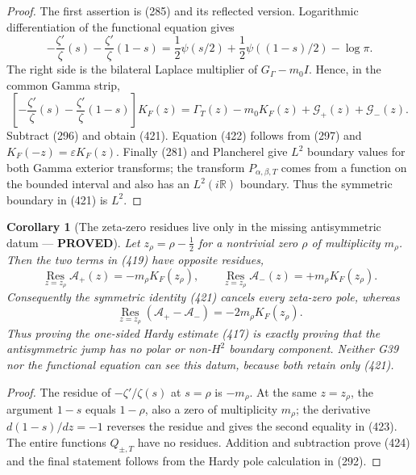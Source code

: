 \documentclass[11pt]{article}
\newtheorem{corollary}[theorem]{Corollary}
\newcommand{\PROVED}{\textcolor{green!45!black}{\textbf{PROVED}}}
\begin{document}
\begin{proof}
The first assertion is (285) and its reflected version.  Logarithmic
differentiation of the functional equation gives
\[
 -\frac{\zeta'}{\zeta}(s)
 -\frac{\zeta'}{\zeta}(1-s)
 =\frac12\psi(s/2)+\frac12\psi((1-s)/2)-\log\pi.
\]
The right side is the bilateral Laplace multiplier of
$G_\Gamma-m_0I$.  Hence, in the common Gamma strip,
\[
 \left[-\frac{\zeta'}{\zeta}(s)
 -\frac{\zeta'}{\zeta}(1-s)\right]K_F(z)
 =\Gamma_T(z)-m_0K_F(z)+\mathscr G_+(z)+\mathscr G_-(z).
\]
Subtract (296) and obtain (421).  Equation (422) follows from (297) and
$K_F(-z)=\varepsilon K_F(z)$.  Finally (281) and Plancherel give $L^2$
boundary values for both Gamma exterior transforms; the transform
$P_{\alpha,\beta,T}$ comes from a function on the bounded interval and also
has an $L^2(i\mathbb R)$ boundary.  Thus the symmetric boundary in (421) is
$L^2$.
\end{proof}

\begin{corollary}[The zeta-zero residues live only in the missing
antisymmetric datum --- \PROVED]
Let $z_\rho=\rho-\tfrac12$ for a nontrivial zero $\rho$ of multiplicity
$m_\rho$.  Then the two terms in (419) have opposite residues,
\begin{equation}
 \operatorname*{Res}_{z=z_\rho}\mathscr A_+(z)
   =-m_\rho K_F(z_\rho),\qquad
 \operatorname*{Res}_{z=z_\rho}\mathscr A_-(z)
   =+m_\rho K_F(z_\rho).                             \tag{423}
\end{equation}
Consequently the symmetric identity (421) cancels every zeta-zero pole,
whereas
\begin{equation}
 \operatorname*{Res}_{z=z_\rho}
  (\mathscr A_+-\mathscr A_-)
 =-2m_\rho K_F(z_\rho).                              \tag{424}
\end{equation}
Thus proving the one-sided Hardy estimate (417) is exactly proving that the
antisymmetric jump has no polar or non-$H^2$ boundary component.  Neither
G39 nor the functional equation can see this datum, because both retain
only (421).
\end{corollary}

\begin{proof}
The residue of $-\zeta'/\zeta(s)$ at $s=\rho$ is $-m_\rho$.
At the same $z=z_\rho$, the argument $1-s$ equals $1-\rho$, also a zero of
multiplicity $m_\rho$; the derivative $d(1-s)/dz=-1$ reverses the residue
and gives the second equality in (423).  The entire functions $Q_{\pm,T}$
have no residues.  Addition and subtraction prove (424) and the final
statement follows from the Hardy pole calculation in (292).
\end{proof}
\end{document}
